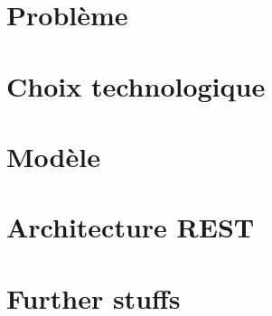 \begin{frame}
 \tableofcontents
\end{frame}

\section{Problème}


\section{Choix technologique}


\section{Modèle}


\section{Architecture REST}


\section{Further stuffs}

 

